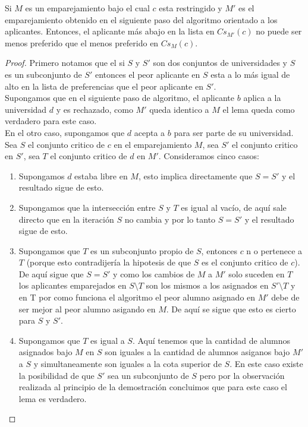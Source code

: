 \begin{lem}
\label{lemaAOA2}
Si $M$ es un emparejamiento bajo el cual $c$ esta restringido y $M'$ es el emparejamiento obtenido en el siguiente paso del algoritmo orientado a los aplicantes. Entonces, el aplicante más abajo en la lista en  $Cs_{M'}(c)$ no puede ser menos preferido que el menos preferido en $Cs_M(c)$.
\end{lem}
\begin{proof}
Primero notamos que el si $S$ y $S'$ son dos conjuntos de universidades y $S$ es un subconjunto de $S'$ entonces el peor aplicante en $S$ esta a lo más igual de alto en la lista de preferencias que el peor aplicante en $S'$. \\
Supongamos que en el siguiente paso de algoritmo, el aplicante $b$ aplica a la universidad $d$ y es rechazado, como $M'$ queda identico a $M$ el lema queda como verdadero para este caso. \\
En el otro caso, supongamos que $d$ acepta a $b$ para ser parte de su universidad. Sea $S$ el conjunto critico de $c$ en el emparejamiento $M$, sea $S'$ el conjunto critico en $S'$, sea $T$ el conjunto critico de $d$ en $M'$. Consideramos cinco casos:
\begin{enumerate}
\item Supongamos $d$ estaba libre en $M$, esto implica directamente que $S=S'$ y el resultado sigue de esto.
\item Supongamos que la intersección entre $S$ y $T$ es igual al vacío, de aquí sale directo que en la iteración $S$ no cambia y por lo tanto $S=S'$ y el resultado sigue de esto.
\item Supongamos que $T$ es un subconjunto propio de $S$, entonces $c$ n o pertenece a $T$ (porque esto contradijería la hipotesis de que $S$ es el conjunto critico de $c$). De aquí sigue que $S=S'$ y como los cambios de $M$  a $M'$ solo suceden en $T$ los aplicantes emparejados en $S\setminus T$ son los mismos a los asignados en $S' \setminus T$ y en T por como funciona el algoritmo el peor alumno asignado en $M'$ debe de ser mejor al peor alumno asigando en $M$. De aquí se sigue que esto es cierto para $S$ y $S'$.
\item Supongamos que $T$ es igual a $S$. Aquí tenemos que la cantidad de alumnos asignados bajo $M$ en $S$ son iguales a la cantidad de alumnos asiganos bajo $M'$ a $S$ y simultaneamente son iguales a la cota superior de $S$. En este caso existe la posibilidad de que $S'$ sea un subconjunto de $S$ pero por la observación realizada al principio de la demostración concluimos que para este caso el lema es verdadero.

\end{enumerate}
\end{proof}
